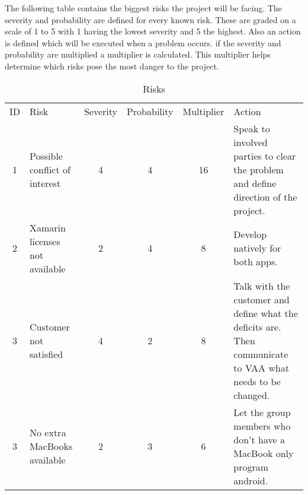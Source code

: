 The following table contains the biggest risks the project will be facing. The severity and probability are defined for every known risk. These are graded on a scale of 1 to 5 with 1 having the lowest severity and 5 the highest. Also an action is defined which will be executed when a problem occurs. if the severity and probability are multiplied a multiplier is calculated. This multiplier helps determine which risks pose the most danger to the project.

\begin{table}[htbp]
\label{risk}
{
\begin{tabular}{c  p{3cm}  c  c  c  p{4cm} }
	ID & Risk & Severity & Probability & Multiplier & Action \\
	1 & Possible conflict of interest  & 4 & 4 & 16 & Speak to involved parties to clear the problem and define direction of the project. \\
	2 & Xamarin licenses not available & 2 & 4 & 8 & Develop natively for both apps. \\
	3 & Customer not satisfied  & 4 & 2 & 8 & Talk with the customer and define what the deficits are. Then communicate to VAA what needs to be changed.\\
	3 & No extra MacBooks available  & 2 & 3 & 6 & Let the group members who don't have a MacBook only program android. \\	
\end{tabular}}
\caption{Risks}
\end{table}